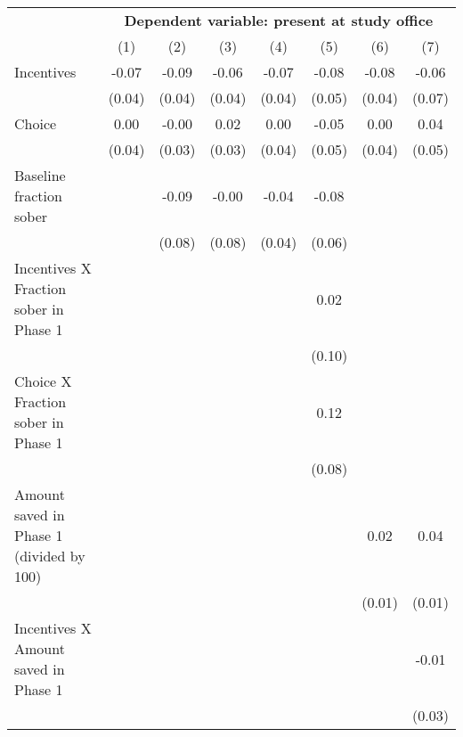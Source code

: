 \begin{tabular}{l c c c c c c c} \toprule &\multicolumn{7}{c}{\textbf{Dependent variable: present at study office}}\\\cmidrule(lr){2-8}&\multicolumn{1}{c}{(1)}&\multicolumn{1}{c}{(2)}&\multicolumn{1}{c}{(3)}&\multicolumn{1}{c}{(4)}&\multicolumn{1}{c}{(5)}&\multicolumn{1}{c}{(6)}&\multicolumn{1}{c}{(7)}\\
\midrule
Incentives          &       -0.07&       -0.09&       -0.06&       -0.07&       -0.08&       -0.08&       -0.06\\
                    &      (0.04)&      (0.04)&      (0.04)&      (0.04)&      (0.05)&      (0.04)&      (0.07)\\
\addlinespace
Choice              &        0.00&       -0.00&        0.02&        0.00&       -0.05&        0.00&        0.04\\
                    &      (0.04)&      (0.03)&      (0.03)&      (0.04)&      (0.05)&      (0.04)&      (0.05)\\
\addlinespace
Baseline fraction sober&            &       -0.09&       -0.00&       -0.04&       -0.08&            &            \\
                    &            &      (0.08)&      (0.08)&      (0.04)&      (0.06)&            &            \\
\addlinespace
Incentives X Fraction sober in Phase 1&            &            &            &            &        0.02&            &            \\
                    &            &            &            &            &      (0.10)&            &            \\
\addlinespace
Choice X Fraction sober in Phase 1&            &            &            &            &        0.12&            &            \\
                    &            &            &            &            &      (0.08)&            &            \\
\addlinespace
Amount saved in Phase 1 (divided by 100)&            &            &            &            &            &        0.02&        0.04\\
                    &            &            &            &            &            &      (0.01)&      (0.01)\\
\addlinespace
Incentives X Amount saved in Phase 1&            &            &            &            &            &            &       -0.01\\
                    &            &            &            &            &            &            &      (0.03)\\

\end{tabular}
